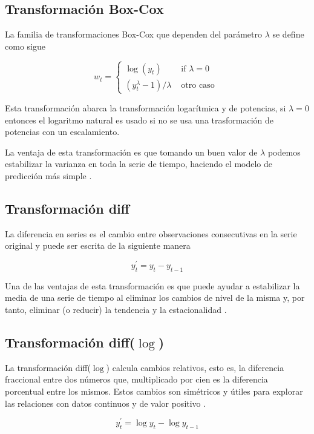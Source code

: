 \subsection{Transformación Box-Cox}
La familia de transformaciones Box-Cox que dependen del parámetro $\lambda$ se define como sigue

\[
w_{t}= \begin{cases}\log \left(y_{t}\right) & \text { if } \lambda=0 \\ \left(y_{t}^{\lambda}-1\right) / \lambda & \text { otro caso }\end{cases}
\]

Esta transformación abarca la transformación logarítmica y de potencias, si $\lambda = 0$ entonces el logaritmo natural es usado si no se usa una trasformación de potencias con un escalamiento.

La ventaja de esta transformación es que tomando un buen valor de $\lambda$ podemos estabilizar la varianza en toda la serie de tiempo, haciendo el modelo de predicción más simple \cite{hyndmanForecastingPrinciplesPractice}. 

\subsection{Transformación diff}

La diferencia en series es el cambio entre observaciones consecutivas en la serie original y puede ser escrita de la siguiente manera

\[
y_{t}^{\prime}=y_{t}-y_{t-1}
\]

Una de las ventajas de esta transformación es que puede ayudar a estabilizar la media de una serie de tiempo al eliminar los cambios de nivel de la misma y, por tanto, eliminar (o reducir) la tendencia y la estacionalidad \cite{hyndmanForecastingPrinciplesPractice}.

\subsection{Transformación diff($\log$)}

La transformación diff($\log$) calcula cambios relativos, esto es, la diferencia fraccional entre dos números que, multiplicado por cien es la diferencia porcentual entre los mismos. Estos cambios son simétricos y útiles para explorar las relaciones con datos continuos y de valor positivo \cite{coleStatisticsNotesPercentage2017}.

\[
y_{t}^{\prime}=\log{y_{t}}-\log{y_{t-1}}
\]

